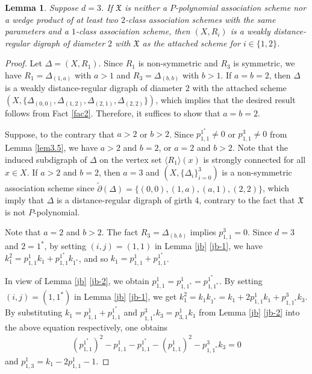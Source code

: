 \documentclass[12pt,a4paper]{amsart}
\newtheorem{lemma}[thm]{Lemma}
\theoremstyle{definition}
\begin{document}
\begin{lemma}\label{lem3.7}
Suppose $d=3$. If $\mathfrak{X}$ is neither a $P$-polynomial association scheme nor a wedge product of at least two $2$-class association schemes with the same parameters and a $1$-class association scheme, then $(X,R_i)$ is a weakly distance-regular digraph of diameter $2$ with $\mathfrak{X}$ as the attached scheme for $i\in\{1,2\}$.
\end{lemma}
\begin{proof}
Let $\Delta=(X,R_1)$. Since $R_1$ is non-symmetric and $R_3$ is symmetric, we have $R_1=\Delta_{(1,a)}$  with $a>1$ and $R_3=\Delta_{(b,b)}$  with $b>1$. If $a=b=2$, then $\Delta$ is a weakly distance-regular digraph of diameter $2$ with the attached scheme $(X,\{\Delta_{(0,0)},\Delta_{(1,2)},\Delta_{(2,1)},\Delta_{(2,2)}\})$, which implies that the desired result follows from Fact \ref{fac2}. Therefore, it suffices to show that $a=b=2$.

Suppose, to the contrary that $a>2$ or $b>2$. Since $p_{1,1}^{1^{*}}\neq 0$ or $p_{1,1}^{3}\neq 0$ from Lemma \ref{lem3.5}, we have $a>2$ and $b=2$, or $a=2$ and $b>2$. Note that the induced subdigraph of $\Delta$ on the vertex set $\langle R_1\rangle(x)$ is strongly connected for all $x\in X$. If $a>2$ and $b=2$, then $a=3$ and $(X,\{\Delta_i\}_{i=0}^3)$ is a non-symmetric association scheme since $\tilde{\partial}(\Delta)= \{(0,0),(1,a),(a,1),(2,2)\}$, which imply that $\Delta$ is a distance-regular digraph of girth $4$, contrary to the fact that $\mathfrak{X}$ is not $P$-polynomial.

Note that $a=2$ and $b>2$. The fact $R_3=\Delta_{(b,b)}$ implies $p_{1,1}^{3}=0$. Since $d=3$ and $2=1^*$, by setting $(i,j)=(1,1)$ in Lemma \ref{jb} \ref{jb-1}, we have $k^2_{1}=p_{1,1}^{1}k_{1}+p_{1,1}^{1^{*}}k_{1^{*}}$, and so $k_1=p_{1,1}^1+p_{1,1}^{1^*}$.

In view of Lemma \ref{jb} \ref{jb-2}, we obtain $p_{1,1}^{1}=p_{1,1^{*}}^{1}=p_{1,1^{*}}^{1^{*}}.$ By setting $(i,j)=(1,1^{*})$ in Lemma \ref{jb} \ref{jb-1}, we get $k_1^2=k_{1}k_{1^{*}}=k_1+2p_{1,1}^{1}k_{1}+p_{1,1^{*}}^{3}k_{3}$. By substituting $k_1=p_{1,1}^1+p_{1,1}^{1^*}$ and $p_{1,1^*}^3k_3=p_{3,1}^1k_1$ from Lemma \ref{jb} \ref{jb-2} into the above equation respectively, one obtains
\begin{align}
(p_{1,1}^{1^*})^{2}-p_{1,1}^1-p_{1,1}^{1^*}-(p_{1,1}^1)^{2}-p_{1,1^*}^3 k_3=0\label{bkb}
\end{align}
and $p_{1,3}^1=k_1-2p_{1,1}^1-1$.


\end{proof}
\end{document}
